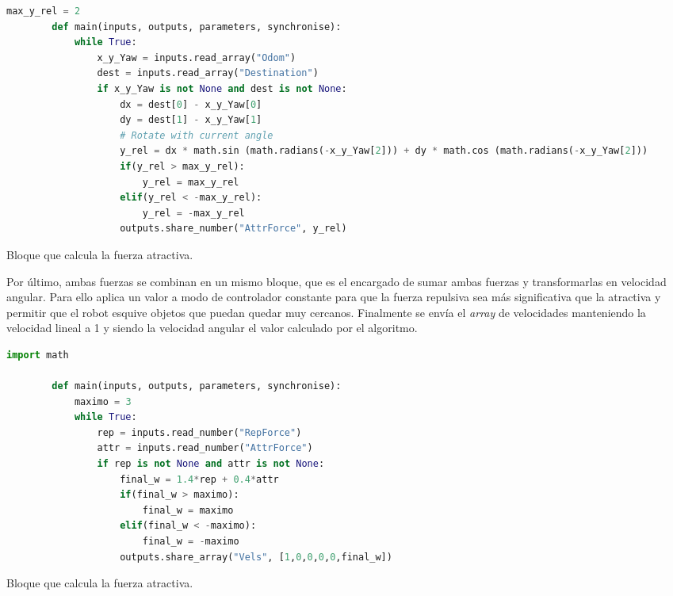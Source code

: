 \begin{code}[H]
    \begin{lstlisting}[language=python]
        max_y_rel = 2
        def main(inputs, outputs, parameters, synchronise):
            while True:
                x_y_Yaw = inputs.read_array("Odom")
                dest = inputs.read_array("Destination")
                if x_y_Yaw is not None and dest is not None:
                    dx = dest[0] - x_y_Yaw[0]
                    dy = dest[1] - x_y_Yaw[1]
                    # Rotate with current angle
                    y_rel = dx * math.sin (math.radians(-x_y_Yaw[2])) + dy * math.cos (math.radians(-x_y_Yaw[2]))
                    if(y_rel > max_y_rel):
                        y_rel = max_y_rel
                    elif(y_rel < -max_y_rel):
                        y_rel = -max_y_rel
                    outputs.share_number("AttrForce", y_rel)
    \end{lstlisting}
    \caption[Bloque fuerza atractiva]{Bloque que calcula la fuerza atractiva.}
    \label{cod:attr_vel}
\end{code}

Por último, ambas fuerzas se combinan en un mismo bloque, que es el encargado de sumar ambas fuerzas y transformarlas en velocidad angular. Para ello aplica
un valor a modo de controlador constante para que la fuerza repulsiva sea más significativa que la atractiva y permitir que el robot esquive objetos que
puedan quedar muy cercanos. Finalmente se envía el \textit{array} de velocidades manteniendo la velocidad lineal a 1 y siendo la velocidad angular el valor
calculado por el algoritmo.

\begin{code}[H]
    \begin{lstlisting}[language=python]
        import math

        def main(inputs, outputs, parameters, synchronise):
            maximo = 3
            while True:            
                rep = inputs.read_number("RepForce")
                attr = inputs.read_number("AttrForce")
                if rep is not None and attr is not None:
                    final_w = 1.4*rep + 0.4*attr
                    if(final_w > maximo):
                        final_w = maximo
                    elif(final_w < -maximo):
                        final_w = -maximo
                    outputs.share_array("Vels", [1,0,0,0,0,final_w])
    \end{lstlisting}
    \caption[Bloque fuerza atractiva]{Bloque que calcula la fuerza atractiva.}
    \label{cod:attr_vel}
\end{code}

